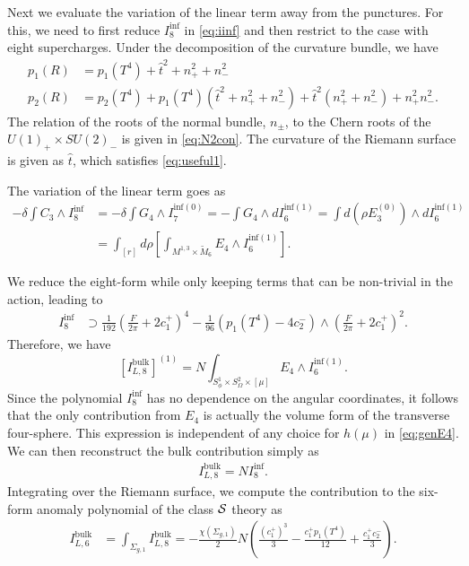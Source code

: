 \documentclass[a4paper,11pt]{article}
\newcommand{\ba}[1]{\begin{align} #1 \end{align} }
\def\CS{{\cal S}}
\begin{document}
Next we evaluate the variation of the linear term away from the punctures.  For this, we need to first reduce $I_8^{\text{inf}}$ in \eqref{eq:iinf} and then restrict to the case with eight supercharges.  Under the decomposition of the curvature bundle, we have
\begin{align}
p_1(R) &= p_1(T^4) + \hat{t}^2 + n_+^2 + n_-^2 \label{eq:p1}\\
p_2(R) &= p_2(T^4) +p_1(T^4) \left( \hat{t}^2 + n_+^2 + n_-^2 \right) + \hat{t}^2 (n_+^2 + n_-^2) + n_+^2 n_-^2.\label{eq:p2}
\end{align} The relation of the roots of the normal bundle, $n_\pm$, to the Chern roots of the $U(1)_+ \times SU(2)_-$ is given in \eqref{eq:N2con}.  The curvature of the Riemann surface is given as $\hat{t}$, which satisfies \eqref{eq:useful1}. 


The variation of the linear term goes as
\begin{align}
- \delta \int {C}_3 \wedge  {I}_8^{\text{inf}} &=- \delta \int {G}_4 \wedge  {I}_7^{\text{inf}(0)} = - \int {G}_4 \wedge d  {I}_6^{\text{inf}(1)} = \int d\left(\rho {E}_3^{(0)} \right) \wedge d  {I}_6^{\text{inf}(1)} \\
&= \int_{[r]} d\rho \left[ \int_{M^{1,3} \times \widetilde{M}_6} {E}_4 \wedge  {I}_6^{\text{inf}(1)}  \right].
\end{align} 


We reduce the eight-form while only keeping terms that can be non-trivial in the action, leading to
\begin{align}
 {I}_8^{\text{inf}} &\supset \frac{1}{192}  \left(\frac{{F}}{2\pi} + 2c_1^+ \right)^4 -\frac{1}{96} \left( p_1(T^4) - 4 c_2^- \right)\wedge \left(\frac{{F}}{2\pi} + 2c_1^+ \right)^2.
\end{align} 
Therefore, we have
\begin{equation}
\left[I_{L,8}^{\text{bulk}} \right]^{(1)} = N \int_{S^1_\phi\times S^2_\Omega\times[\mu]}{E}_4 \wedge  {I}_6^{\text{inf}(1)}.\label{eq:lbulkf}
\end{equation}
 Since the polynomial $I_8^{\text{inf}}$ has no dependence on the angular coordinates, it follows that the only contribution from $E_4$ is actually the volume form of the transverse four-sphere.  This expression is independent of any choice for $h(\mu)$ in \eqref{eq:genE4}.  We can then reconstruct the bulk contribution simply as 
	\ba{
	I_{L,8}^{\text{bulk}} = N I_8^{\text{inf}}.
	}
Integrating over the Riemann surface, we compute the contribution to the six-form anomaly polynomial of the class $\CS$ theory as
\ba{
I_{L,6}^{\text{bulk}} &= \int_{\Sigma_{g,1}} I_{L,8}^{\text{bulk}} = -\frac{\chi(\Sigma_{g,1}) }{2} N \left( \frac{(c_1^+)^3}{3}  - \frac{c_1^+ p_1(T^4) }{12} + \frac{c_1^+ c_2^-}{3}   \right).  \label{eq:IbulkL}
}
\end{document}
